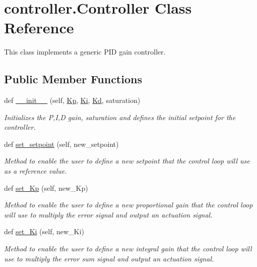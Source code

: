 \hypertarget{classcontroller_1_1Controller}{}\section{controller.\+Controller Class Reference}
\label{classcontroller_1_1Controller}


This class implements a generic P\+ID gain controller.  


\subsection*{Public Member Functions}
\begin{DoxyCompactItemize}
\item 
def \hyperlink{classcontroller_1_1Controller_a97098372dd1025e6518686ac8d34e5cb}{\+\_\+\+\_\+init\+\_\+\+\_\+} (self, \hyperlink{classcontroller_1_1Controller_a34cf377d78ee193d7160d74adbe9aabf}{Kp}, \hyperlink{classcontroller_1_1Controller_ae2cdbac964e61042bab697b094df1e02}{Ki}, \hyperlink{classcontroller_1_1Controller_aa67f4d0fe3cb5e3659bf036eaa44f246}{Kd}, saturation)
\begin{DoxyCompactList}\small\item\em Initializes the P,I,D gain, saturation and defines the initial setpoint for the controller. \end{DoxyCompactList}\item 
def \hyperlink{classcontroller_1_1Controller_acee6fffdca024ce396a2260b72e99059}{set\+\_\+setpoint} (self, new\+\_\+setpoint)
\begin{DoxyCompactList}\small\item\em Method to enable the user to define a new setpoint that the control loop will use as a reference value. \end{DoxyCompactList}\item 
def \hyperlink{classcontroller_1_1Controller_a048d7ed4722c40579b6bfbea25ae98c0}{set\+\_\+\+Kp} (self, new\+\_\+\+Kp)
\begin{DoxyCompactList}\small\item\em Method to enable the user to define a new proportional gain that the control loop will use to multiply the error signal and output an actuation signal. \end{DoxyCompactList}\item 
def \hyperlink{classcontroller_1_1Controller_a8442b219e2ad2a91acc4918212465d91}{set\+\_\+\+Ki} (self, new\+\_\+\+Ki)
\begin{DoxyCompactList}\small\item\em Method to enable the user to define a new integral gain that the control loop will use to multiply the error sum signal and output an actuation signal. \end{DoxyCompactList}\item 

\end{DoxyCompactItemize}
